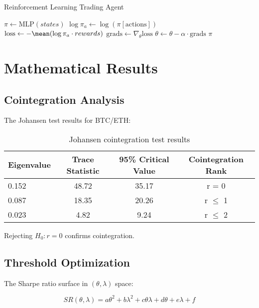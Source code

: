 \documentclass[article]{arithmaxresearch}
\begin{document}
\begin{algorithm}[h]
\caption{Reinforcement Learning Trading Agent}
\label{alg:rl}
\begin{algorithmic}[1]
    \State $\pi \gets \text{MLP}(states)$
    \State $\log \pi_a \gets \log(\pi[\text{actions}])$
    \State $\text{loss} \gets -\mean(\log \pi_a \cdot rewards)$
    \State $\text{grads} \gets \nabla_{\theta} \text{loss}$
    \State $\theta \gets \theta - \alpha \cdot \text{grads}$
    \State \Return $\pi$
\EndFunction
\end{algorithmic}
\end{algorithm}

\section{Mathematical Results}

\subsection{Cointegration Analysis}

The Johansen test results for BTC/ETH:

\begin{table}[h]
\centering
\begin{tabular}{lccc}
\toprule
Eigenvalue & Trace Statistic & 95\% Critical Value & Cointegration Rank \\
\midrule
0.152 & 48.72 & 35.17 & r = 0 \\
0.087 & 18.35 & 20.26 & r $\leq$ 1 \\
0.023 & 4.82 & 9.24 & r $\leq$ 2 \\
\bottomrule
\end{tabular}
\caption{Johansen cointegration test results}
\end{table}

Rejecting $H_0: r=0$ confirms cointegration.

\subsection{Threshold Optimization}

The Sharpe ratio surface in $(\theta, \lambda)$ space:

\begin{equation}
SR(\theta, \lambda) = a\theta^2 + b\lambda^2 + c\theta\lambda + d\theta + e\lambda + f
\end{equation}
\end{document}
